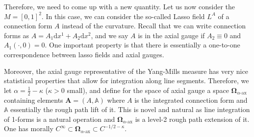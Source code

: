 \documentclass[11pt]{article}
\numberwithin{equation}{section}
\theoremstyle{definition}
\theoremstyle{remark}
\newcommand{\dif}{\,\mathrm{d}}
\newcommand{\diff}{\mathrm{d}}
\newcommand{\1}{\mathbf 1}
\newcommand{\<}{\langle}
\renewcommand{\>}{\rangle}
\newcommand{\ax}{\text{-}\mathrm{ax}}
\newcommand{\bfA}{\mathbf A}
\newcommand{\bA}{\mathbb A}
\newcommand{\bfOmega}{\boldsymbol{\Omega}}
\begin{document}
Therefore, we need to come up with a new quantity. Let us now consider the $M=[0,1]^2$. In this case, we can consider the so-called Lasso field $L^A$ of a connection form $A$ instead of the curvature. Recall that we can write connection forms as $A=A_1\diff x^1+A_2\diff x^2$, and we say $A$ is in the axial gauge if $A_2\equiv 0$ and $A_1(\cdot,0)=0$. One important property is that there is essentially a one-to-one correspondence between lasso fields and axial gauges. 

Moreover, the axial gauge representative of the Yang-Mills measure has very nice statistical properties that allow for integration along line segments. Therefore, we let $\alpha=\frac 1 2-\kappa$ ($\kappa>0$ small), and define for the space of axial gauge a space $\bfOmega_{\alpha\ax}$ containing elements $\bfA=(A,\bA)$ where $A$ is the integrated connection form and $\bA$ essentially the rough path lift of it. 
%
%
%
This is novel and natural as line integration of 1-forms is a natural operation and $\bfOmega_{\alpha\ax}$ is a level-2 rough path extension of it. 
%
One has morally $C^\infty\subset \bfOmega_{\alpha\ax}\subset C^{-1/2-\kappa}$.

\end{document}
